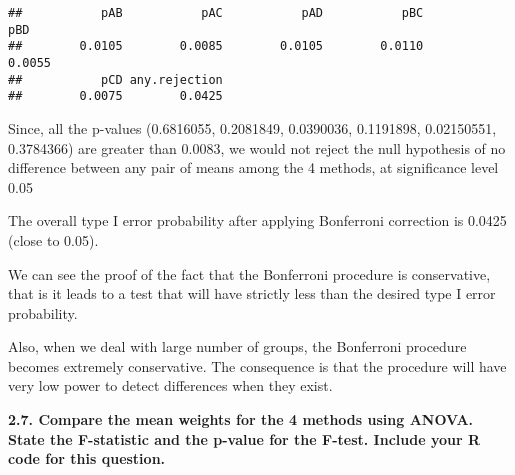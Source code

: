 \documentclass[
]{article}
\begin{document}
\begin{verbatim}
##           pAB           pAC           pAD           pBC           pBD 
##        0.0105        0.0085        0.0105        0.0110        0.0055 
##           pCD any.rejection 
##        0.0075        0.0425
\end{verbatim}

Since, all the p-values (0.6816055, 0.2081849, 0.0390036, 0.1191898,
0.02150551, 0.3784366) are greater than 0.0083, we would not reject the
null hypothesis of no difference between any pair of means among the 4
methods, at significance level 0.05

The overall type I error probability after applying Bonferroni
correction is 0.0425 (close to 0.05).

We can see the proof of the fact that the Bonferroni procedure is
conservative, that is it leads to a test that will have strictly less
than the desired type I error probability.

Also, when we deal with large number of groups, the Bonferroni procedure
becomes extremely conservative. The consequence is that the procedure
will have very low power to detect differences when they exist.

\textbf{2.7. Compare the mean weights for the 4 methods using ANOVA.
State the F-statistic and the p-value for the F-test. Include your R
code for this question.}
\end{document}
